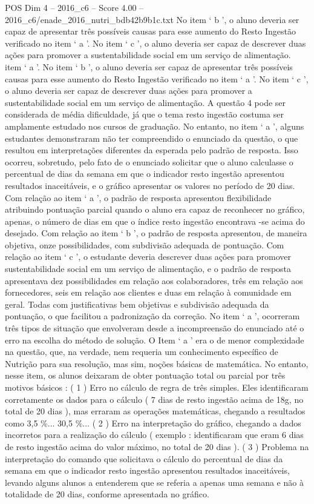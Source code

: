 \begin{textsample}{POS Dim 4 – 2016\_c6 – Score 4.00 – 2016\_c6/enade\_2016\_nutri\_bdb42b9b1c.txt}
No item ‘ b ’, o aluno deveria ser capaz de apresentar três possíveis causas para esse aumento do Resto Ingestão verificado no item ‘ a ’.
No item ‘ c ’, o aluno deveria ser capaz de descrever duas ações para promover a sustentabilidade social em um serviço de alimentação. item ‘ a ’.
No item ‘ b ’, o aluno deveria ser capaz de apresentar três possíveis causas para esse aumento do Resto Ingestão verificado no item ‘ a ’.
No item ‘ c ’, o aluno deveria ser capaz de descrever duas ações para promover a sustentabilidade social em um serviço de alimentação.
A questão 4 pode ser considerada de média dificuldade, já que o tema resto ingestão costuma ser amplamente estudado nos cursos de graduação.
No entanto, no item ‘ a ’, alguns estudantes demonstraram não ter compreendido o enunciado da questão, o que resultou em interpretações diferentes da esperada pelo padrão de resposta.
Isso ocorreu, sobretudo, pelo fato de o enunciado solicitar que o aluno calculasse o percentual de dias da semana em que o indicador resto ingestão apresentou resultados inaceitáveis, e o gráfico apresentar os valores no período de 20 dias.
Com relação ao item ‘ a ’, o padrão de resposta apresentou flexibilidade atribuindo pontuação parcial quando o aluno era capaz de reconhecer no gráfico, apenas, o número de dias em que o índice resto ingestão encontrava -se acima do desejado.
Com relação ao item ‘ b ’, o padrão de resposta apresentou, de maneira objetiva, onze possibilidades, com subdivisão adequada de pontuação.
Com relação ao item ‘ c ’, o estudante deveria descrever duas ações para promover sustentabilidade social em um serviço de alimentação, e o padrão de resposta apresentava dez possibilidades em relação aos colaboradores, três em relação aos fornecedores, seis em relação aos clientes e duas em relação à comunidade em geral.
Todas com justificativas bem objetivas e subdivisão adequada da pontuação, o que facilitou a padronização da correção.
No item ‘ a ’, ocorreram três tipos de situação que envolveram desde a incompreensão do enunciado até o erro na escolha do método de solução.
O Item ‘ a ’ era o de menor complexidade na questão, que, na verdade, nem requeria um conhecimento específico de Nutrição para sua resolução, mas sim, noções básicas de matemática.
No entanto, nesse item, os alunos deixaram de obter pontuação total ou parcial por três motivos básicos : ( 1 ) Erro no cálculo de regra de três simples.
Eles identificaram corretamente os dados para o cálculo ( 7 dias de resto ingestão acima de 18g, no total de 20 dias ), mas erraram as operações matemáticas, chegando a resultados como 3,5 \%... 30,5 \%... ( 2 ) Erro na interpretação do gráfico, chegando a dados incorretos para a realização do cálculo ( exemplo : identificaram que eram 6 dias de resto ingestão acima do valor máximo, no total de 20 dias ). ( 3 ) Problema na interpretação do comando que solicitava o cálculo do percentual de dias da semana em que o indicador resto ingestão apresentou resultados inaceitáveis, levando alguns alunos a entenderem que se referia a apenas uma semana e não à totalidade de 20 dias, conforme apresentada no gráfico.

\end{textsample}
